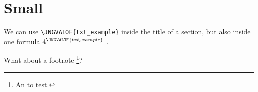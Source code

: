 \documentclass[12pt]{article}
\begin{document}
\section{Small }

We can use \verb#\JNGVALOF{txt_example}# inside the title of a section,
but also inside one formula $4^{\JNGVALOF{txt_example}}$ .

What about a footnote
\footnote{
	An  to test.
}?
\end{document}
